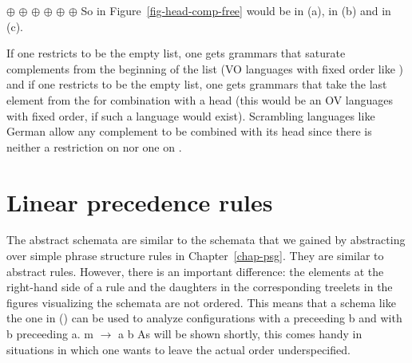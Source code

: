 \eal
\ex \eliste{} $\oplus$  $\oplus$  
\ex {} $\oplus$  $\oplus$  
\ex {} $\oplus$  $\oplus$ \eliste 
\zl
So  in Figure~\ref{fig-head-comp-free} would be \npnom in (a), \npdat in (b) and \npacc in (c).

If one restricts  to be the
empty list, one gets grammars that saturate complements from the beginning of the list (VO languages
with fixed order like ) and if one restricts  to be the empty list, one gets grammars that take the last
element from the \compsl for combination with a head (this would be an OV languages with fixed
order, if such a language would exist). Scrambling languages like German allow any
complement to be combined with its head since there is neither a restriction on  nor one on .






\section{Linear precedence rules}
\label{sec-lp-rules}

The abstract schemata are similar to the schemata that we gained by abstracting over simple phrase
structure rules in Chapter~\ref{chap-psg}. They are similar to abstract \xbar rules. However, there
is an important difference: the elements at the right-hand side of a rule and the daughters in the
corresponding treelets in the figures visualizing the schemata are not ordered. This means that a
schema like the one in () can be used to analyze configurations with a preceeding b and with
b preceeding a.
\ea
m $\to$ a b
\z
As will be shown shortly, this comes handy in situations in which one wants to leave the actual
order underspecified.

